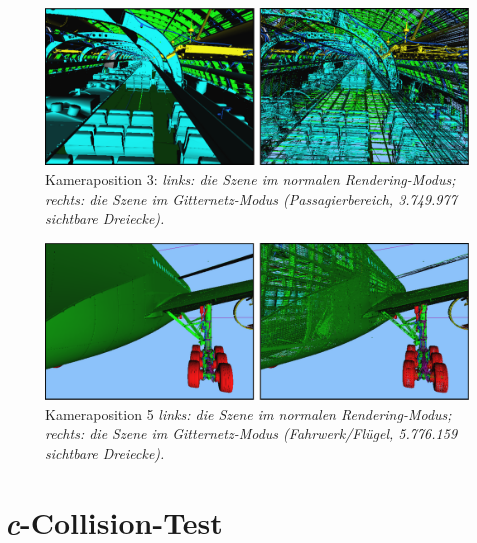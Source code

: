 \begin{figure}
\centering
\includegraphics[scale=0.40]{images/pos3.pdf}
\caption{\label{fig:eval:pos3}Kameraposition 3: \textit{links: die Szene im normalen Rendering-Modus; rechts: die Szene im Gitternetz-Modus (Passagierbereich, 3.749.977 sichtbare Dreiecke).}}
\end{figure}

\begin{figure}
\centering
\includegraphics[scale=0.40]{images/pos5.pdf}
\caption{\label{fig:eval:pos5}Kameraposition 5 \textit{links: die Szene im normalen Rendering-Modus; rechts: die Szene im Gitternetz-Modus (Fahrwerk/Flügel, 5.776.159 sichtbare Dreiecke).}}
\end{figure}

\section{\textit{c}-Collision-Test}
\label{sec:eval:ccollision}

